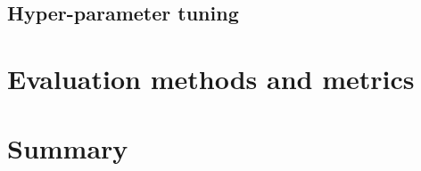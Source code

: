 \documentclass[thesis.tex]{subfiles}
\begin{document}
\subsection{Hyper-parameter tuning}



\section{Evaluation methods and metrics}
%


\section{Summary} \label{sec:C3-summary}
\end{document}
